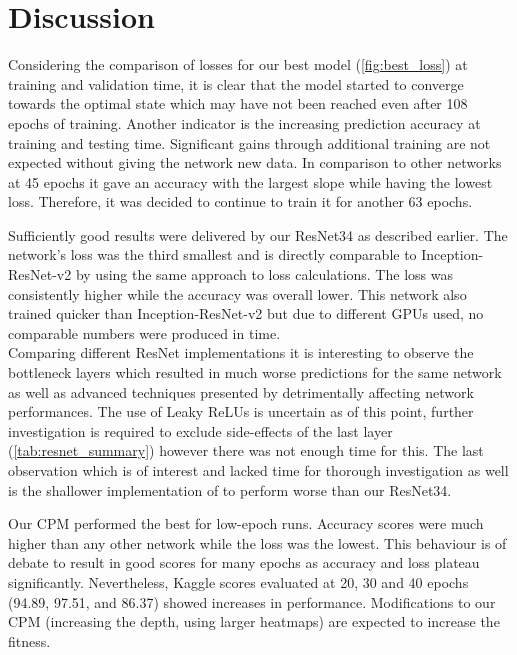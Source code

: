 \section{Discussion}
Considering the comparison of losses for our best model (\autoref{fig:best_loss}) at training and validation time, it is clear that the model started to converge towards the optimal state which may have not been reached even after 108 epochs of training. Another indicator is the increasing prediction accuracy at training and testing time. Significant gains through additional training are not expected without giving the network new data. In comparison to other networks at 45 epochs it gave an accuracy with the largest slope while having the lowest loss. Therefore, it was decided to continue to train it for another 63 epochs.

Sufficiently good results were delivered by our ResNet34 as described earlier. The network's loss was the third smallest and is directly comparable to Inception-ResNet-v2 by using the same approach to loss calculations. The loss was consistently higher while the accuracy was overall lower. This network also trained quicker than Inception-ResNet-v2 but due to different GPUs used, no comparable numbers were produced in time.\\
Comparing different ResNet implementations it is interesting to observe the bottleneck layers which resulted in much worse predictions for the same network as well as advanced techniques presented by \citet{DBLP:journals/corr/HeZR016} detrimentally affecting network performances. The use of Leaky ReLUs is uncertain as of this point, further investigation is required to exclude side-effects of the last layer (\autoref{tab:resnet_summary}) however there was not enough time for this. The last observation which is of interest and lacked time for thorough investigation as well is the shallower implementation of \citet{DBLP:journals/corr/InsafutdinovPAA16} to perform worse than our ResNet34.

Our CPM performed the best for low-epoch runs. Accuracy scores were much higher than any other network while the loss was the lowest. This behaviour is of debate to result in good scores for many epochs as accuracy and loss plateau significantly.  Nevertheless, Kaggle scores evaluated at 20, 30 and 40 epochs (94.89, 97.51, and 86.37) showed increases in performance. Modifications to our CPM (increasing the depth, using larger heatmaps) are expected to increase the fitness.

